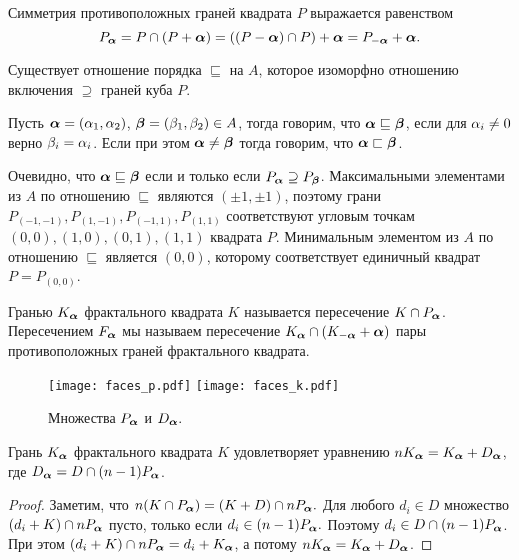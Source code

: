 Симметрия противоположных граней квадрата $P$ выражается равенством 
$$P_{\bm{\alpha}}=P\cap(P+{\bm{\alpha}})=((P-{\bm{\alpha}})\cap P)+{\bm{\alpha}}=P_{-{\bm{\alpha}}}+{\bm{\alpha}}.$$


Существует отношение порядка $\sqsubseteq$ на $A$, которое изоморфно отношению включения $\supseteq$ граней куба $P$.

\begin{definition}\label{Aorder}
Пусть ${\bm{\alpha}}=(\alpha_1,\alpha_2)$, ${\bm{\beta}}=(\beta_1,\beta_2)\in A$, тогда говорим, что ${\bm{\alpha}}\sqsubseteq{\bm{\beta}}$, если для $\alpha_i\neq 0$ верно $\beta_i=\alpha_i$.
Если при этом ${\bm{\alpha}}\neq{\bm{\beta}}$ тогда говорим, что ${\bm{\alpha}}\sqsubset{\bm{\beta}}$.
\end{definition}

Очевидно, что ${\bm{\alpha}}\sqsubseteq{\bm{\beta}}$ если и только если $P_{\bm{\alpha}}\supseteq P_{\bm{\beta}}$. 
Максимальными элементами из $A$ по отношению $\sqsubseteq$ являются $(\pm 1,\pm 1)$, поэтому грани $P_{(-1,-1)}, P_{(1,-1)}, P_{(-1,1)}, P_{(1,1)}$ соответствуют угловым точкам $(0,0), (1,0), (0,1), (1,1)$ квадрата $P$.
Минимальным элементом из $A$ по отношению $\sqsubseteq$ является $(0,0)$, которому соответствует единичный квадрат $P=P_{(0,0)}$.

\begin{definition}\label{def-falpha}
Гранью $K_{\bm{\alpha}}$ фрактального квадрата $K$ называется пересечение $K\cap P_{\bm{\alpha}}$.
Пересечением $F_{\bm{\alpha}}$ мы называем пересечение $K_{\bm{\alpha}}\cap(K_{-{\bm{\alpha}}}+{\bm{\alpha}})$ пары противоположных граней фрактального квадрата.
\end{definition}



\begin{figure}[H]
 \centering
 \texttt{[image: faces\_p.pdf]}
 \hfill
 \texttt{[image: faces\_k.pdf]}
 \caption{Множества $P_{\bm{\alpha}}$ и $D_{\bm{\alpha}}.$}
 \label{fig:faces}
\end{figure}

\begin{proposition}\label{prop:Ka}
Грань $K_{\bm{\alpha}}$ фрактального квадрата $K$ удовлетворяет уравнению $n K_{\bm{\alpha}}=K_{\bm{\alpha}}+D_{\bm{\alpha}}$, где $D_{\bm{\alpha}}=D\cap(n-1)P_{\bm{\alpha}}$.
\end{proposition}

\begin{proof}
Заметим, что $n(K\cap P_{\bm{\alpha}})=(K+D)\cap nP_{\bm{\alpha}}.$ 
Для любого $d_i\in D$ множество $(d_i+K)\cap nP_{\bm{\alpha}}$ пусто, только если $d_i\in(n-1)P_{\bm{\alpha}}.$ 
Поэтому $d_i\in D\cap (n-1)P_{\bm{\alpha}}$. 
При этом $(d_i+K)\cap nP_{\bm{\alpha}}=d_i+K_{\bm{\alpha}}$, а потому $n K_{\bm{\alpha}}={K_{\bm{\alpha}}+D_{\bm{\alpha}}}$.
\end{proof}

